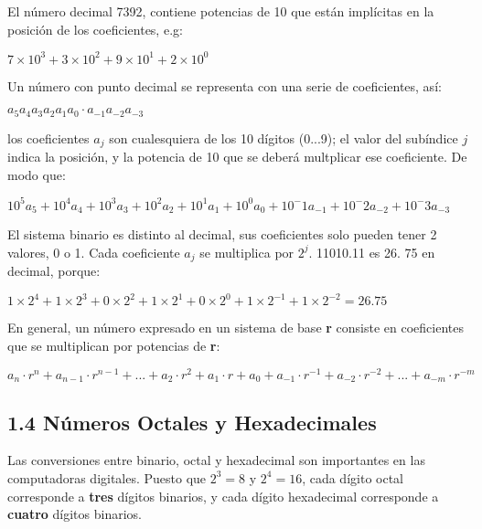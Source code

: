 El n\'{u}mero decimal 7392, contiene potencias de 10 que est\'{a}n
impl\'{i}citas en la posici\'{o}n de los coeficientes, e.g: \medskip

\begin{center} $7 \times 10^3 + 3 \times 10^2 + 9 \times 10^1 + 2 \times 10^0$
\end{center}

Un n\'{u}mero con punto decimal se representa con una serie de coeficientes,
as\'{i}:

\begin{center} \large $a_5a_4a_3a_2a_1a_0 \cdot a_{-1}a_{-2}a_{-3}$
\end{center}

los coeficientes $a_j$ son cualesquiera de los 10 d\'{i}gitos (0...9); el valor
del sub\'{i}ndice $j$ indica la posici\'{o}n, y la potencia de 10 que se
deber\'{a} multplicar ese coeficiente. De modo que:

\begin{center} $10^5a_5 + 10^4a_4 + 10^3a_3 + 10^2a_2 + 10^1a_1 + 10^0a_0 +
        10^-1a_{-1} + 10^-2a_{-2} + 10^-3a_{-3}$ \end{center}

El sistema binario es distinto al decimal, sus coeficientes solo pueden tener 2
valores, 0 o 1. Cada coeficiente $a_j$ se multiplica por $2^j$. 11010.11 es 26.
75 en decimal, porque:

\begin{center} $1 \times 2^4 + 1 \times 2^3 + 0 \times 2^2 + 1 \times 2^1 + 0
        \times 2^0 + 1 \times 2^{-1} + 1 \times 2^{-2} = 26.75$ \end{center}

En general, un n\'{u}mero expresado en un sistema de base \textbf{r} consiste
en coeficientes que se multiplican por potencias de \textbf{r}:

\begin{center} $a_n \cdot r^n + a_{n-1} \cdot r^{n-1} +...+ a_2 \cdot r^2 + a_1
        \cdot r + a_0 + a_{-1} \cdot r^{-1} + a_{-2} \cdot r^{-2} +...+ a_{-m} \cdot
        r^{-m}$ \end{center}

\subsection*{1.4 N\'{u}meros Octales y Hexadecimales}

Las conversiones entre binario, octal y hexadecimal son importantes en las
computadoras digitales. Puesto que $2^3 = 8$ y $2^4 = 16$, cada d\'{i}gito octal
corresponde a \textbf{tres} d\'{i}gitos binarios, y cada d\'{i}gito hexadecimal
corresponde a \textbf{cuatro} d\'{i}gitos binarios.

